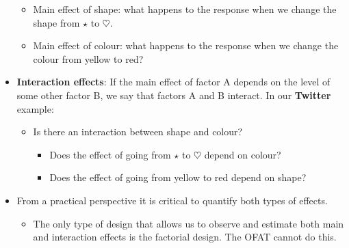 \begin{itemize}
            \begin{itemize}
                  \item Main effect of shape: what happens to the response when we change the shape from $ \star $ to $ \heartsuit $.
                  \item Main effect of colour: what happens to the response when we change the colour from yellow to red?
            \end{itemize}
      \item \textbf{Interaction effects}: If the main effect of factor A depends on the level of some other factor B, we
            say that factors A and B interact. In our \textbf{Twitter} example:
            \begin{itemize}
                  \item Is there an interaction between shape and colour?
                        \begin{itemize}[$\iff$]
                              \item Does the effect of going from $ \star $ to $ \heartsuit $ depend on colour?
                              \item Does the effect of going from yellow to red depend on shape?
                        \end{itemize}
            \end{itemize}
      \item From a practical perspective it is critical to quantify both types of effects.
            \begin{itemize}
                  \item The only type of design that allows us to observe and estimate both main and interaction effects
                        is the factorial design. The OFAT cannot do this.
            \end{itemize}
\end{itemize}
